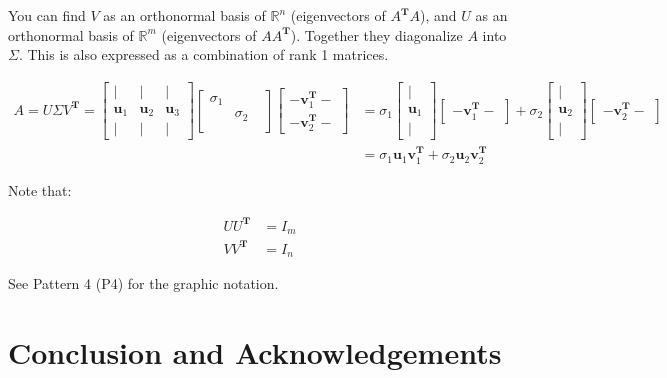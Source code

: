 \documentclass[letterpaper]{article}
\begin{document}
You can find $V$ as an orthonormal basis of $\mathbb{R}^n$ (eigenvectors of $A^\mathbf{T}A$),
and $U$ as an orthonormal basis of $\mathbb{R}^m$ (eigenvectors of $AA^\mathbf{T}$).
Together they diagonalize $A$ into $\Sigma$.
This is also expressed as a combination of rank 1 matrices.

\begin{align*}
  A = U \Sigma V^\mathbf{T} =
  \begin{bmatrix}
    | & | & |\\
    \bm{u}_1 & \bm{u}_2 & \bm{u}_3\\
    | & | & |
  \end{bmatrix}
  \begin{bmatrix}
    \sigma_1 \\
           & \sigma_2 \\
           & &
  \end{bmatrix}
  \begin{bmatrix}
  - \bm{v}_1^\mathbf{T} -\\
  - \bm{v}_2^\mathbf{T} -
  \end{bmatrix}
  & =
  \sigma_1 \begin{bmatrix}
    |\\
    \bm{u}_1\\
    |
  \end{bmatrix}
  \begin{bmatrix}
    - \bm{v}_1^\mathbf{T} - 
  \end{bmatrix}
  +
  \sigma_2 \begin{bmatrix}
  |\\
  \bm{u}_2\\
  |
  \end{bmatrix}
  \begin{bmatrix}
  - \bm{v}_2^\mathbf{T} -
  \end{bmatrix} \\
& = \sigma_1 \bm{u}_1 \bm{v}_1^\mathbf{T} + \sigma_2 \bm{u}_2 \bm{v}_2^\mathbf{T}
\end{align*}

Note that:

\begin{align*}
  U U^\mathbf{T} &= I_m \\
  V V^\mathbf{T} &= I_n
\end{align*}

See Pattern 4 (P4) for the graphic notation.

\section*{Conclusion and Acknowledgements}
\end{document}
